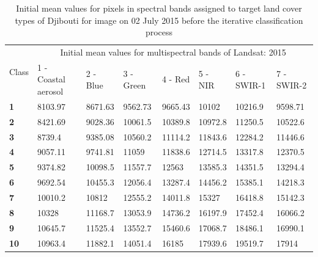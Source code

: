 \documentclass[jimaging,article,submit,pdftex,moreauthors]{Definitions/mdpi}
\begin{document}
\begin{table}[H]
  \centering
  \begin{tabularx}{\textwidth}{p{0.7cm}p{2.5cm}p{1.0cm}p{1.3cm}p{1.0cm}p{1.0cm}p{1.5cm}p{1.5cm}}
  \toprule
  \multirow{2}{*}{Class} & \multicolumn{7}{c}{Initial mean values for multispectral bands of Landsat:  2015} \\
     & 1 - Coastal aerosol & 2 - Blue & 3 - Green & 4 - Red & 5 - NIR & 6 - SWIR-1 & 7 - SWIR-2 \\
    \midrule
    \textbf{1} & 8103.97 & 8671.63 & 9562.73 & 9665.43 & 10102 & 10216.9 & 9598.71 \\
    \textbf{2} & 8421.69 & 9028.36 & 10061.5 & 10389.8 & 10972.8 & 11250.5 & 10522.6 \\
    \textbf{3} & 8739.4 & 9385.08 &10560.2 & 11114.2 & 11843.6 & 12284.2 & 11446.6 \\
    \textbf{4} & 9057.11 & 9741.81 & 11059 & 11838.6 & 12714.5 & 13317.8 & 12370.5 \\
    \textbf{5} & 9374.82 & 10098.5 & 11557.7 & 12563 & 13585.3 & 14351.5 & 13294.4 \\
    \textbf{6} & 9692.54 & 10455.3 & 12056.4 & 13287.4 & 14456.2 & 15385.1 & 14218.3 \\
    \textbf{7} & 10010.2 & 10812 & 12555.2 & 14011.8 & 15327 & 16418.8 & 15142.3 \\
    \textbf{8} & 10328 & 11168.7 & 13053.9 & 14736.2 & 16197.9 & 17452.4 & 16066.2 \\
    \textbf{9} & 10645.7 & 11525.4 & 13552.7 & 15460.6 & 17068.7 & 18486.1 & 16990.1 \\
    \textbf{10} & 10963.4 & 11882.1 & 14051.4 & 16185 & 17939.6 & 19519.7 & 17914 \\
\bottomrule
\end{tabularx}
  \caption{Initial mean values for pixels in spectral bands assigned to target land cover types of Djibouti for image on 02 July 2015 before the iterative classification process}
  \label{tabA1} 
\end{table} 
\end{document}
